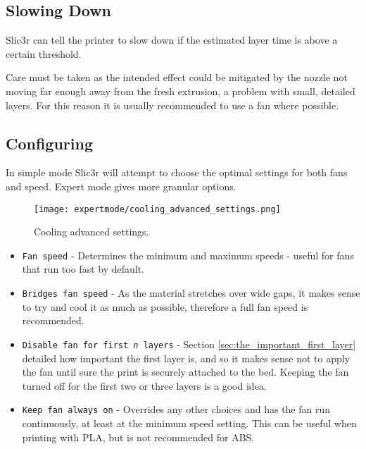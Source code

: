 
\subsection{Slowing Down} %
\label{sub:slowing_down}
Slic3r can tell the printer to slow down if the estimated layer time is above a certain threshold.

Care must be taken as the intended effect could be mitigated by the nozzle not moving far enough away from the fresh extrusion, a problem with small, detailed layers.  For this reason it is usually recommended to use a fan where possible.

\subsection{Configuring} %
\label{sub:configuring_cooling}

In simple mode Slic3r will attempt to choose the optimal settings for both fans and speed.  Expert mode gives more granular options.

\begin{figure}[H]
\centering
\texttt{[image: expertmode/cooling\_advanced\_settings.png]}
\caption{Cooling advanced settings.}
\label{fig:cooling_advanced_settings}
\end{figure}

\begin{itemize}
	\item \texttt{Fan speed}  - Determines the minimum and maximum speeds - useful for fans that run too fast by default.
	\item \texttt{Bridges fan speed}  - As the material stretches over wide gaps, it makes sense to try and cool it as much as possible, therefore a full fan speed is recommended.
	\item \texttt{Disable fan for first \textit{n} layers}  - Section \ref{sec:the_important_first_layer} detailed how important the first layer is, and so it makes sense not to apply the fan until sure the print is securely attached to the bed.  Keeping the fan turned off for the first two or three layers is a good idea.
	\item \texttt{Keep fan always on}  - Overrides any other choices and has the fan run continuously, at least at the minimum speed setting.  This can be useful when printing with PLA, but is not recommended for ABS.
\end{itemize}

